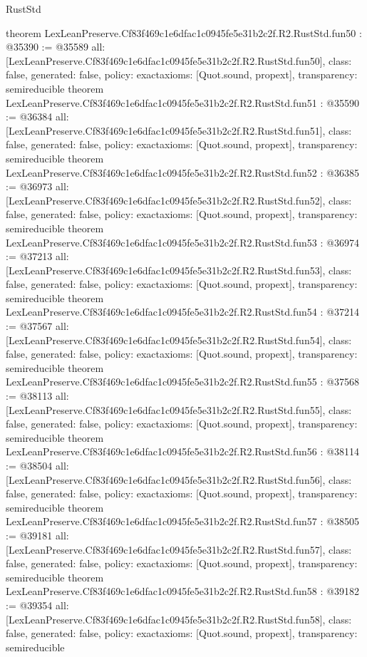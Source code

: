 \begin{lexlean}{RustStd}
\begin{coremodule}
{}
theorem LexLeanPreserve.Cf83f469c1e6dfac1c0945fe5e31b2c2f.R2.RustStd.fun50 : @35390 := @35589 {
  all: [LexLeanPreserve.Cf83f469c1e6dfac1c0945fe5e31b2c2f.R2.RustStd.fun50],
  class: false,
  generated: false,
  policy: exact{axioms: [Quot.sound, propext]},
  transparency: semireducible
}
theorem LexLeanPreserve.Cf83f469c1e6dfac1c0945fe5e31b2c2f.R2.RustStd.fun51 : @35590 := @36384 {
  all: [LexLeanPreserve.Cf83f469c1e6dfac1c0945fe5e31b2c2f.R2.RustStd.fun51],
  class: false,
  generated: false,
  policy: exact{axioms: [Quot.sound, propext]},
  transparency: semireducible
}
theorem LexLeanPreserve.Cf83f469c1e6dfac1c0945fe5e31b2c2f.R2.RustStd.fun52 : @36385 := @36973 {
  all: [LexLeanPreserve.Cf83f469c1e6dfac1c0945fe5e31b2c2f.R2.RustStd.fun52],
  class: false,
  generated: false,
  policy: exact{axioms: [Quot.sound, propext]},
  transparency: semireducible
}
theorem LexLeanPreserve.Cf83f469c1e6dfac1c0945fe5e31b2c2f.R2.RustStd.fun53 : @36974 := @37213 {
  all: [LexLeanPreserve.Cf83f469c1e6dfac1c0945fe5e31b2c2f.R2.RustStd.fun53],
  class: false,
  generated: false,
  policy: exact{axioms: [Quot.sound, propext]},
  transparency: semireducible
}
theorem LexLeanPreserve.Cf83f469c1e6dfac1c0945fe5e31b2c2f.R2.RustStd.fun54 : @37214 := @37567 {
  all: [LexLeanPreserve.Cf83f469c1e6dfac1c0945fe5e31b2c2f.R2.RustStd.fun54],
  class: false,
  generated: false,
  policy: exact{axioms: [Quot.sound, propext]},
  transparency: semireducible
}
theorem LexLeanPreserve.Cf83f469c1e6dfac1c0945fe5e31b2c2f.R2.RustStd.fun55 : @37568 := @38113 {
  all: [LexLeanPreserve.Cf83f469c1e6dfac1c0945fe5e31b2c2f.R2.RustStd.fun55],
  class: false,
  generated: false,
  policy: exact{axioms: [Quot.sound, propext]},
  transparency: semireducible
}
theorem LexLeanPreserve.Cf83f469c1e6dfac1c0945fe5e31b2c2f.R2.RustStd.fun56 : @38114 := @38504 {
  all: [LexLeanPreserve.Cf83f469c1e6dfac1c0945fe5e31b2c2f.R2.RustStd.fun56],
  class: false,
  generated: false,
  policy: exact{axioms: [Quot.sound, propext]},
  transparency: semireducible
}
theorem LexLeanPreserve.Cf83f469c1e6dfac1c0945fe5e31b2c2f.R2.RustStd.fun57 : @38505 := @39181 {
  all: [LexLeanPreserve.Cf83f469c1e6dfac1c0945fe5e31b2c2f.R2.RustStd.fun57],
  class: false,
  generated: false,
  policy: exact{axioms: [Quot.sound, propext]},
  transparency: semireducible
}
theorem LexLeanPreserve.Cf83f469c1e6dfac1c0945fe5e31b2c2f.R2.RustStd.fun58 : @39182 := @39354 {
  all: [LexLeanPreserve.Cf83f469c1e6dfac1c0945fe5e31b2c2f.R2.RustStd.fun58],
  class: false,
  generated: false,
  policy: exact{axioms: [Quot.sound, propext]},
  transparency: semireducible
}
\end{coremodule}
\end{lexlean}
